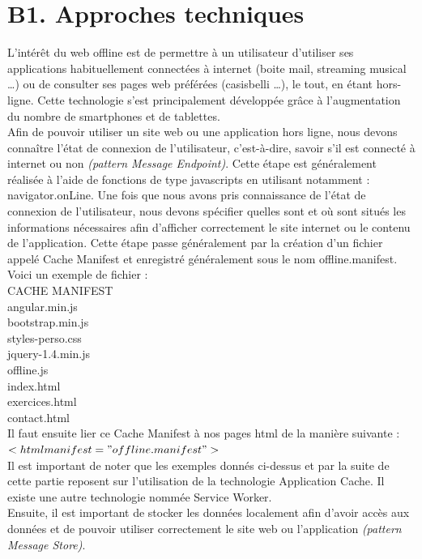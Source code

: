 \section{B1. Approches techniques}

	L'intérêt du web offline est de permettre à un utilisateur d’utiliser ses applications habituellement connectées à internet (boite mail, streaming musical …) ou de consulter ses pages web préférées (casisbelli …), le tout, en étant hors-ligne. Cette technologie s’est principalement développée grâce à l’augmentation du nombre de smartphones et de tablettes. \\

	Afin de pouvoir utiliser un site web ou une application hors ligne, nous devons connaître l’état de connexion de l’utilisateur, c’est-à-dire, savoir s’il est connecté à internet ou non \textit{(pattern Message Endpoint)}. Cette étape est généralement réalisée à l’aide de fonctions de type javascripts en utilisant notamment : navigator.onLine. Une fois que nous avons pris connaissance de l’état de connexion de l’utilisateur, nous devons spécifier quelles sont et où sont situés les informations nécessaires afin d’afficher correctement le site internet ou le contenu de l’application. Cette étape passe généralement par la création d’un fichier appelé Cache Manifest et enregistré généralement sous le nom offline.manifest. Voici un exemple de fichier :\\

	CACHE MANIFEST\\
	angular.min.js\\
	bootstrap.min.js\\
	styles-perso.css\\
	jquery-1.4.min.js\\
	offline.js\\
	index.html\\
	exercices.html\\
	contact.html\\

	Il faut ensuite lier ce Cache Manifest à nos pages html de la manière suivante : \textit{$<html manifest="offline.manifest">$}\\

	Il est important de noter que les exemples donnés ci-dessus et par la suite de cette partie reposent sur l’utilisation de la technologie Application Cache. Il existe une autre technologie nommée Service Worker. \\

	Ensuite, il est important de stocker les données localement afin d’avoir accès aux données et de pouvoir utiliser correctement le site web ou l’application \textit{(pattern Message Store)}. \\

